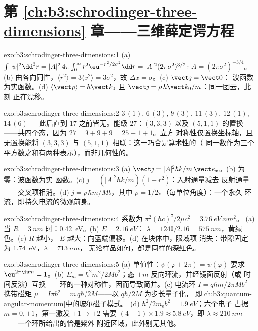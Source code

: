 \section*{第 \ref{ch:b3:schrodinger-three-dimensions} 章——三维薛定谔方程}

\begin{solution}{exo:b3:schrodinger-three-dimensions:1}
(a) $\int|\psi|^2\dd^3r = |A|^2\,4\pi\int_0^\infty r^2\eu^{-r^2/2
\sigma^2}\dd r = |A|^2(2\pi\sigma^2)^{3/2}$: $A = (2\pi\sigma^2)^{
-3/4}$。(b) 由各向同性，$\langle r^2\rangle = 3\langle x^2\rangle =
3\sigma^2$，故 $\Delta x = \sigma$。(c) $\vect\jmath = \vect 0$：
波函数为实函数。(d) $\langle\vect p\rangle = \hbar\vect k_0$
且 $\vect\jmath = \rho\,\hbar\vect k_0/m$：同一团云，此刻
正在漂移。
\end{solution}

\begin{solution}{exo:b3:schrodinger-three-dimensions:2}
$3\,(1)$, $6\,(3)$, $9\,(3)$, $11\,(3)$, $12\,(1)$, $14\,(6)$ ---
此后直到 $17$ 之前皆无。能级 $27$：$(3,3,3)$ 以及
$(5,1,1)$ 的置换——共四个态，因为 $27 = 9+9+9 = 25+1+1$。立方
对称性仅置换坐标轴，且无置换能将 $(3,3,3)$ 与
$(5,1,1)$ 相联：这一巧合是算术性的（
同一数作为三个平方数之和有两种表示），而非几何性的。
\end{solution}

\begin{solution}{exo:b3:schrodinger-three-dimensions:3}
(a) $\vect\jmath = |A|^2\hbar k/m\,\vect e_x$。(b) 为零：波函数为实
函数。(c) $j = (|A|^2\hbar k/m)(1 - r^2)$：入射通量减去
反射通量——交叉项相消。(d) $j = \rho\,\hbar
m/Mb$，其中 $\rho = 1/2\pi$（每单位角度）：一个永久
环流，即持久电流的微观前身。
\end{solution}

\begin{solution}{exo:b3:schrodinger-three-dimensions:4}
系数为 $\pi^2(\hbar c)^2/2\mu c^2 = \qty{3.76}{eV.nm^2}$。
(a) 当 $R = \qty{3}{nm}$ 时：\qty{0.42}{eV}。(b) $E = \qty{2.16}{eV}$：
$\lambda = 1240/2.16 = \qty{575}{nm}$，黄绿色。(c) $R$ 越小，
$E$ 越大：向蓝端偏移。(d) 在块体中，限域项
消失：带隙固定为 \qty{1.74}{eV}，$\lambda = \qty{713}{nm}$，
无论样品如何，都是同样的深红色。
\end{solution}

\begin{solution}{exo:b3:schrodinger-three-dimensions:5}
(a) 单值性：$\psi(\varphi + 2\pi) = \psi(\varphi)$ 要求
$\eu^{2\pi\iu m} = 1$。(b) $E_m = \hbar^2m^2/2Mb^2$；态 $\pm
m$ 反向环流，并经镜面反射（或
时间反演）互换——环的一种对称性，因而导致简并。(c)
电流环 $I = q\hbar m/2\pi Mb^2$ 携带磁矩
$\mu = I\pi b^2 = m\,q\hbar/2M$——以 $q\hbar/2M$ 为步长量子化，
即\cref{ch:b3:quantum-angular-momentum}中的玻尔磁子模式。
(d) $\hbar^2/2m_{\text{e}}b^2 = \qty{1.9}{eV}$；六个电子
占据 $m = 0, \pm1$，第一激发 $\pm1 \to \pm2$ 需要
$(4-1) \times 1.9 \approx \qty{5.8}{eV}$，即 $\lambda \approx
\qty{210}{nm}$——一个环所给出的恰是紫外
附近区域，此外别无其他。
\end{solution}

